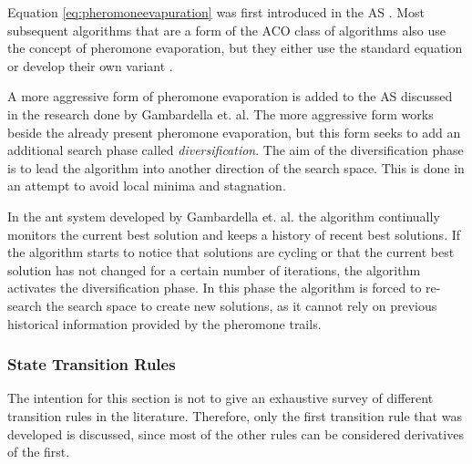 Equation \ref{eq:pheromoneevapuration} was first introduced in the \gls{AS} \cite{CompuIntelligenceIntro,AntSurvey}. Most subsequent algorithms that are a form of the \gls{ACO} class of algorithms also use the concept of pheromone evaporation, but they either use the standard equation or develop their own variant \cite{CompuIntelligenceIntro,AntsAndStigmergy}.

A more aggressive form of pheromone evaporation  is added to the \gls{AS} discussed in the research done by Gambardella et. al\cite{AntQAP}. The more aggressive form works beside the already present pheromone evaporation, but this form seeks to add an additional search phase called \emph{diversification}\cite{AntQAP}. The aim of the diversification phase is to lead the algorithm into another direction of the search space\cite{AntQAP}. This is done in an attempt to avoid local minima and stagnation\cite{AntQAP}.

In the ant system developed by Gambardella et. al. the algorithm continually monitors the current best solution and keeps a history of recent best solutions\cite{AntQAP}. If the algorithm starts to notice that solutions are cycling or that the current best solution has not changed for a certain number of iterations, the algorithm activates the diversification phase\cite{AntQAP}. In this phase the algorithm is forced to re-search the search space to create new solutions, as it cannot rely on previous historical information provided by the pheromone trails\cite{AntQAP}.

\subsubsection{State Transition Rules}
\label{sec:STR}
The intention for this section is not to give an exhaustive survey of different transition rules in the literature. Therefore, only the first transition rule that was developed is discussed, since most of the other rules can be considered derivatives of the first. 

